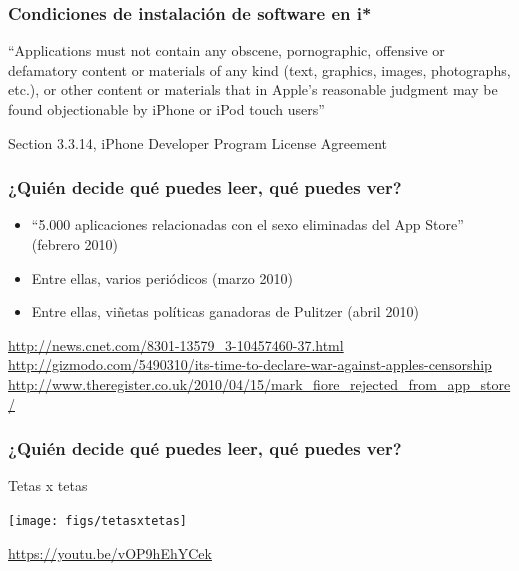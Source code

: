 \documentclass[17pt,aspectratio=169]{beamer}
\begin{document}
\begin{frame}
\frametitle{Condiciones de instalación de software en i*}

``Applications must not contain any obscene, pornographic, offensive or defamatory content or materials of any kind (text, graphics, images, photographs, etc.), or other content or materials that in Apple's reasonable judgment may be found objectionable by iPhone or iPod touch users''

\begin{flushright}
  {\footnotesize
    Section 3.3.14, iPhone Developer Program License Agreement
    }
\end{flushright}
\end{frame}


\begin{frame}
\frametitle{¿Quién decide qué puedes leer, qué puedes ver?}

\begin{itemize}
\item``5.000 aplicaciones relacionadas con el sexo eliminadas del App Store''  (febrero 2010)
  
\item Entre ellas, varios periódicos (marzo 2010)\\

\item Entre ellas, viñetas políticas ganadoras de Pulitzer (abril 2010)\\
\end{itemize}

  \begin{flushright}
    {\tiny
      \url{http://news.cnet.com/8301-13579_3-10457460-37.html}\\
      \url{http://gizmodo.com/5490310/its-time-to-declare-war-against-apples-censorship}\\
      \url{http://www.theregister.co.uk/2010/04/15/mark_fiore_rejected_from_app_store/}\\
    }
  \end{flushright}

\end{frame}



\begin{frame}
\frametitle{¿Quién decide qué puedes leer, qué puedes ver?}

  Tetas x tetas

\begin{center}
\texttt{[image: figs/tetasxtetas]}
\end{center}

{\tiny \url{https://youtu.be/vOP9hEhYCek}}
\end{frame}
\end{document}
